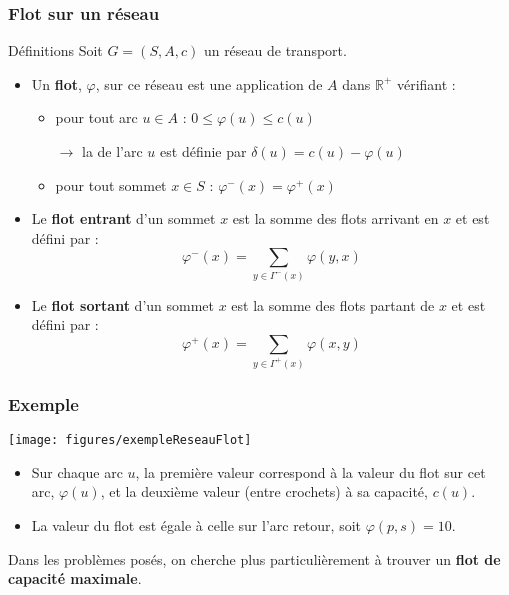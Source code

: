 \documentclass[french,10pt,t,handout]{beamer}
\begin{document}
\begin{frame}
	\frametitle{Flot sur un r\'eseau}

	\begin{block}{D\'efinitions}
		Soit $G=(S,A,c)$ un r\'eseau de transport. 
		\begin{itemize}
		  \item Un \textbf{flot}, $\varphi$, sur ce r\'eseau est une application de $A$
		  dans $\mathbb{R}^+$ v\'erifiant :
		  	\begin{itemize}
		  		\item pour tout arc $u \in A$ : $0 \leq \varphi(u) \leq c(u)$
		  		\item[$\rightarrow$] la  de l'arc $u$
		  							 est d\'efinie par $\delta(u) = c(u) - \varphi(u)$ 
		  		\item[]
		  		\item pour tout sommet $x \in S$ : $\varphi^-(x) = \varphi^+(x)$
			\end{itemize}
		  \vspace{0.3cm}
		  \item Le \textbf{flot entrant} d'un sommet $x$ est la somme des flots arrivant en $x$ et 
		  est d\'efini par : $$\varphi^-(x) = \sum_{y \in \Gamma^-(x)}\varphi(y,x)$$
		  \item Le \textbf{flot sortant} d'un sommet $x$ est la somme des flots partant de $x$ et 
		  est d\'efini par : $$\varphi^+(x) = \sum_{y \in \Gamma^+(x)} \varphi(x,y)$$
		\end{itemize}	
	\end{block}
	
\end{frame}
	
	

\begin{frame}[t]
	\frametitle{Exemple}
	\vspace{-0.8cm}

	\begin{center}
		\texttt{[image: figures/exempleReseauFlot]}
	\end{center}
	
	\begin{itemize}
	  \item Sur chaque arc $u$, la premi\`ere valeur correspond \`a la valeur du
	  flot sur cet arc, $\varphi(u)$, et la deuxi\`eme valeur (entre crochets) \`a
	  sa capacit\'e, $c(u)$.
	  \item La valeur du flot est \'egale \`a celle sur l'arc retour, soit
	  $\varphi(p, s) = 10$.
	\end{itemize}
	
	\vspace{0.4cm}
	Dans les probl\`emes pos\'es, on cherche plus particuli\`erement \`a trouver un
	\textbf{flot de capacit\'e maximale}.
\end{frame}
\end{document}
